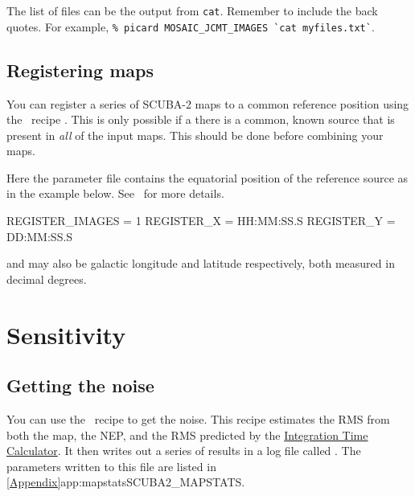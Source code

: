 \begin{tip}
  The list of files can be the output from \texttt{cat}. Remember
  to include the back quotes.  For example, \texttt{\% picard
    MOSAIC\_JCMT\_IMAGES \`{}cat myfiles.txt\`{}}.
\end{tip}


\subsection{Registering maps}

You can register a series of SCUBA-2 maps to a common reference
position using the \picard\ recipe
.
This is only possible if a there is a common, known source that is
present in \textit{all} of the input maps. This should be done before
combining your maps.

\begin{terminalv}
\end{terminalv}

Here the parameter file contains the equatorial position of the
reference source as in the example below. See \picardsun\ for more
details.

\begin{terminalv}
REGISTER_IMAGES = 1
REGISTER_X  = HH:MM:SS.S
REGISTER_Y  = DD:MM:SS.S
\end{terminalv}

 and  may also be galactic
longitude and latitude respectively, both measured in decimal
degrees.

\section{Sensitivity}

\subsection{Getting the noise}
\label{sec:mapstats}

You can use the \picard\ recipe  to get the
noise. This recipe estimates the RMS from both the map, the NEP, and
the RMS predicted by the
 \href{https://www.eaobservatory.org/jcmt/instrumentation/continuum/scuba-2/itc/}{Integration
 Time Calculator}. It then writes out
a series of results in a log file called . The
parameters written to this file are listed in
\cref{Appendix}{app:mapstats}{SCUBA2_MAPSTATS}.

